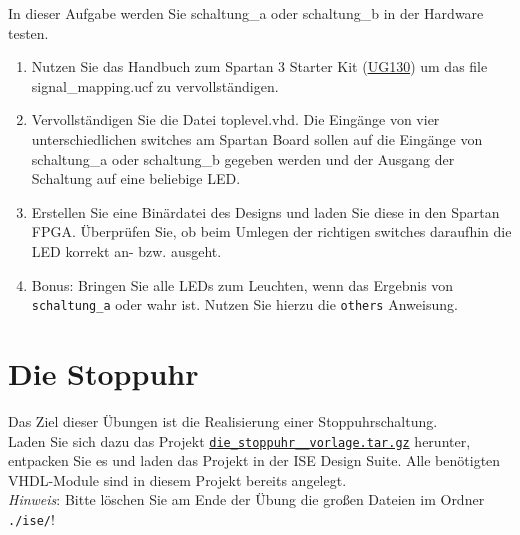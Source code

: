 \documentclass[12pt]{article}
\begin{document}
In dieser Aufgabe werden Sie schaltung\_a oder schaltung\_b in der Hardware testen.


\begin{enumerate}[label=\alph*.)]


\item Nutzen Sie das Handbuch zum Spartan 3 Starter Kit (\href{https://www.xilinx.com/support/documentation/boards_and_kits/ug130.pdf}{UG130}) um das file signal\_mapping.ucf
zu vervollständigen.


\item Vervollständigen Sie die Datei toplevel.vhd. Die Eingänge von vier unterschiedlichen switches
am Spartan Board sollen auf die Eingänge von schaltung\_a oder schaltung\_b gegeben werden
und der Ausgang der Schaltung auf eine beliebige LED.


\item Erstellen Sie eine Binärdatei des Designs und laden Sie diese in den Spartan FPGA.
Überprüfen Sie, ob beim Umlegen der richtigen switches daraufhin die LED korrekt an- bzw.
ausgeht.


\item Bonus: Bringen Sie alle LEDs zum Leuchten, wenn das Ergebnis von \texttt{schaltung\_a} oder  wahr ist. Nutzen Sie hierzu die \texttt{others} Anweisung.


\end{enumerate}





\part*{Die Stoppuhr}


Das Ziel dieser Übungen ist die Realisierung einer Stoppuhrschaltung.\\

Laden Sie sich dazu das Projekt \textcolor{blue}{\href{https://ilias.uni-freiburg.de/goto.php?target=file_1740380_download&client_id=unifreiburg}{\texttt{die\_stoppuhr\_\_vorlage.tar.gz}}} herunter, entpacken Sie es und laden das Projekt in der ISE Design Suite. Alle benötigten VHDL-Module sind in diesem Projekt bereits angelegt.\\

\textit{Hinweis}: Bitte löschen Sie am Ende der Übung die großen Dateien im Ordner \texttt{./ise/}!
\end{document}

